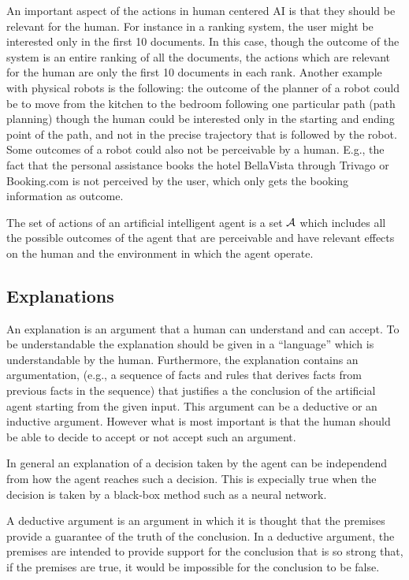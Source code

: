 An important aspect of the actions in human centered AI is that they
should be relevant for the human. For instance in a ranking system,
the user might be interested only in the first 10 documents. In this
case, though the outcome of the system is an entire ranking of all the
documents, the actions which are relevant for the human are only the
first 10 documents in each rank. Another example with physical robots
is the following: the outcome of the planner of a robot could be to
move from the kitchen to the bedroom following one particular path
(path planning) though the human could be interested only in the
starting and ending point of the path, and not in the precise
trajectory that is followed by the robot. Some outcomes of a robot
could also not be perceivable by a human. E.g., the fact that the
personal assistance books the hotel BellaVista through Trivago or
Booking.com is not perceived by the user, which only gets the booking
information as outcome.

\begin{definition}
  The set of actions of an artificial intelligent agent is a set
  $\mathcal{A}$ which includes all the possible outcomes of the 
  agent that are perceivable and have relevant effects on the human and the
  environment in which the agent operate.
\end{definition}

\subsection{Explanations} 
An explanation is an argument that a human can understand and can
accept. To be understandable the explanation should be given in a
``language'' which is understandable by the human. Furthermore, the
explanation contains an argumentation, (e.g., a sequence of facts and
rules that derives facts from previous facts in the sequence) that
justifies a the conclusion of the artificial agent starting from the
given input. This argument can be a deductive or an inductive
argument. However what is most important is that the human should be
able to decide to accept or not accept such an argument.

In general an explanation of a decision taken by the agent can be
independend from how the agent reaches such a decision. This is
expecially true when the decision is taken by a black-box method such
as a neural network. 

A deductive argument is an argument in which it is thought that the
premises provide a guarantee of the truth of the conclusion. In a
deductive argument, the premises are intended to provide support for
the conclusion that is so strong that, if the premises are true, it
would be impossible for the conclusion to be false.

